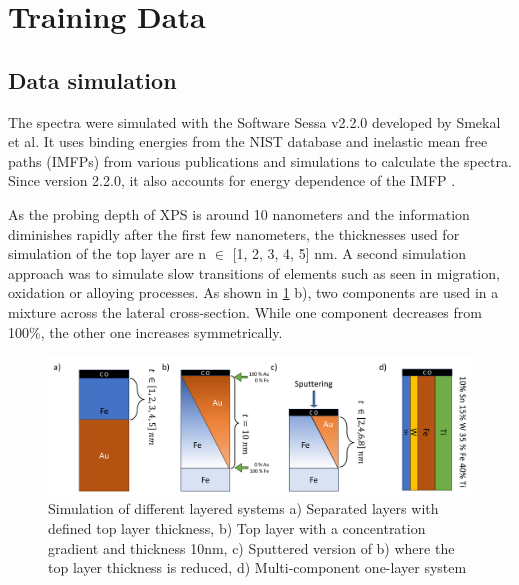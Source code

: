 

\section{Training Data}
\label{train_data}


\subsection{Data simulation}

The spectra were simulated with the Software Sessa v2.2.0 developed by Smekal et al. It uses binding energies from the NIST database and inelastic mean free paths (IMFPs) from various publications and simulations to calculate the spectra. Since version 2.2.0, it also accounts for energy dependence of the IMFP \cite{noauthor_nist_2010}.

As the probing depth of XPS is around 10 nanometers and the information diminishes rapidly after the first few nanometers, the thicknesses used for simulation of the top layer are n $\in$ [1, 2, 3, 4, 5] nm. A second simulation approach was to simulate slow transitions of elements such as seen in migration, oxidation or alloying processes. As shown in \ref{fig:layers} b), two components are used in a mixture across the lateral cross-section. While one component decreases from 100\%, the other one increases symmetrically.

\begin{figure}
    \centering
    \includegraphics[width=\textwidth]{Figures/layers.png}
    \caption{Simulation of different layered systems a) Separated layers with defined top layer thickness, b) Top layer with a concentration gradient and thickness 10nm, c) Sputtered version of b) where the top layer thickness is reduced, d) Multi-component one-layer system}
    \label{fig:layers}
\end{figure}


